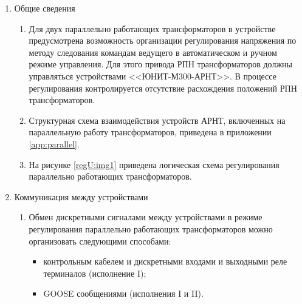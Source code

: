 
\color{black}

\begin{enumerate}


\item Общие сведения

\begin{enumerate}

\item
Для двух параллельно работающих трансформаторов  в устройстве предусмотрена возможность организации регулирования напряжения по методу следования командам ведущего в автоматическом и ручном режиме управления. Для этого привода РПН трансформаторов должны управляться устройствами <<ЮНИТ-М300-АРНТ>>. В процессе регулирования контролируется отсутствие расхождения положений РПН трансформаторов.

\item
Структурная схема взаимодействия устройств АРНТ, включенных на параллельную работу трансформаторов, приведена в приложении \ref{app:parallel}.

\item На рисунке \ref{regU:img1} приведена логическая схема регулирования параллельно работающих трансформаторов.


\end{enumerate}


\item Коммуникация между устройствами

\begin{enumerate}

\item Обмен дискретными сигналами между устройствами в режиме регулирования параллельно работающих трансформаторов можно организовать следующими способами:
\begin{itemize}
\item контрольным кабелем и дискретными входами и выходными реле терминалов (исполнение I);
\item GOOSE сообщениями (исполнения I и II).
\end{itemize}


\end{enumerate}
\end{enumerate}
